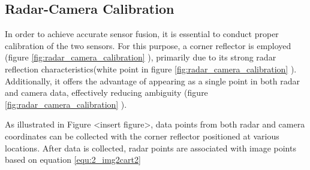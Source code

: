 \subsection{Radar-Camera Calibration}
In order to achieve accurate sensor fusion, it is essential to conduct proper calibration of the two sensors. 
For this purpose, a corner reflector is employed (figure \ref*{fig:radar_camera_calibration} ), primarily due to its strong radar reflection characteristics(white point in figure \ref*{fig:radar_camera_calibration} ). 
Additionally, it offers the advantage of appearing as a single point in both radar and camera data, effectively reducing ambiguity (figure \ref*{fig:radar_camera_calibration} ).

As illustrated in Figure <insert figure>, data points from both radar 
and camera coordinates can be collected with the corner reflector positioned at various locations.
After data is collected, radar points are associated with image points based on equation \ref*{equ:2_img2cart2}
